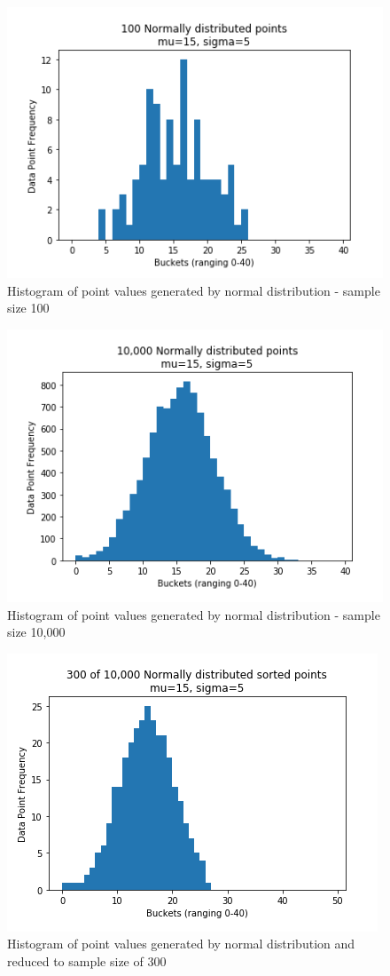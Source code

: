 \begin{figure}[H]
\centering
\includegraphics[scale=0.7]{law1.png}
\caption{Histogram of point values generated by normal distribution - sample size 100}
\label{fig:law1}
\end{figure}

\begin{figure}[H]
\centering
\includegraphics[scale=0.7]{law2.png}
\caption{Histogram of point values generated by normal distribution - sample size 10,000}
\label{fig:law2}
\end{figure}

\begin{figure}[H]
\centering
\includegraphics[scale=0.7]{law3.png}
\caption{Histogram of point values generated by normal distribution and reduced to sample size of 300}
\label{fig:law3}
\end{figure}


